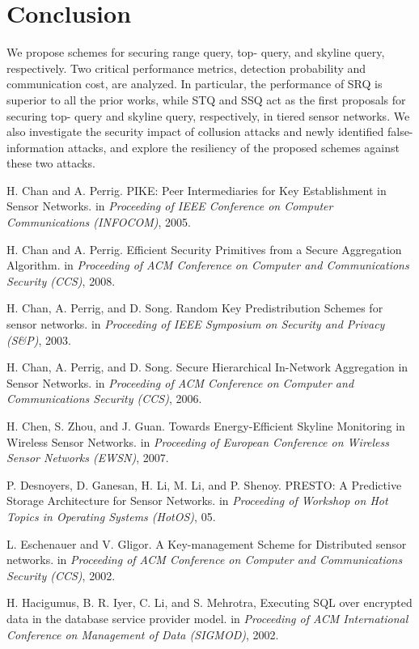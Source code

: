 \documentclass[conference]{IEEEtran}
\begin{document}
\section{Conclusion}\label{sec: Conclusion}
We propose schemes for securing range query, top- query, and skyline query, respectively. Two critical performance metrics, detection probability and communication cost, are analyzed. In particular, the performance of SRQ is superior to all the prior works, while STQ and SSQ act as the first proposals for securing top- query and skyline query, respectively, in tiered sensor networks. We also investigate the security impact of collusion attacks and newly identified false-information attacks, and explore the resiliency of the proposed schemes against these two attacks.
\begin{thebibliography}{1}
H. Chan and A. Perrig. PIKE: Peer Intermediaries for Key Establishment in Sensor Networks. in \emph{Proceeding of IEEE Conference on Computer Communications (INFOCOM)}, 2005.

H. Chan and A. Perrig. Efficient Security Primitives from a Secure Aggregation Algorithm. in \emph{Proceeding of ACM Conference on Computer and Communications Security (CCS)}, 2008.

H. Chan, A. Perrig, and D. Song. Random Key Predistribution Schemes for sensor networks. in \emph{Proceeding of IEEE Symposium on Security and Privacy (S\&P)}, 2003.

H. Chan, A. Perrig, and D. Song. Secure Hierarchical In-Network Aggregation in Sensor Networks. in \emph{Proceeding of ACM Conference on Computer and Communications Security (CCS)}, 2006.

H. Chen, S. Zhou, and J. Guan. Towards Energy-Efficient Skyline Monitoring in Wireless Sensor Networks. in \emph{Proceeding of European Conference on Wireless Sensor Networks (EWSN)}, 2007.

P. Desnoyers, D. Ganesan, H. Li, M. Li, and P. Shenoy. PRESTO: A Predictive Storage Architecture for Sensor Networks. in \emph{Proceeding of Workshop on Hot Topics in Operating Systems (HotOS)}, 05.

L. Eschenauer and V. Gligor. A Key-management Scheme for Distributed sensor networks. in \emph{Proceeding of ACM Conference on Computer and Communications Security (CCS)}, 2002.

H. Hacigumus, B. R. Iyer, C. Li, and S. Mehrotra, Executing SQL over encrypted data in the database service provider model. in \emph{Proceeding of ACM International Conference on Management of Data (SIGMOD)}, 2002.


\end{thebibliography}
\end{document}
